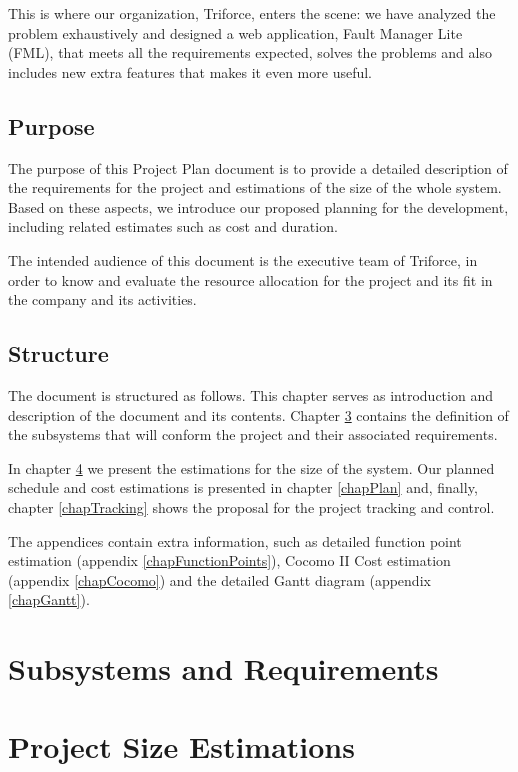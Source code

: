 \documentclass[11pt]{report}
\begin{document}
This is where our organization, Triforce, enters the scene: we have analyzed the problem exhaustively and designed a web application, Fault Manager Lite (FML), that meets all the requirements expected, solves the problems and also includes new extra features that makes it even more useful.

\section{Purpose}

The purpose of this Project Plan document is to provide a detailed description of the requirements for the project and estimations of the size of the whole system. Based on these aspects, we introduce our proposed planning for the development, including related estimates such as cost and duration.

The intended audience of this document is the executive team of Triforce, in order to know and evaluate the resource allocation for the project and its fit in the company and its activities.

\section{Structure}

The document is structured as follows. This chapter serves as introduction and description of the document and its contents. Chapter \ref{chapSubsystems} contains the definition of the subsystems that will conform the project and their associated requirements.

In chapter \ref{chapProjectSizeEstimations} we present the estimations for the size of the system. Our planned schedule and cost estimations is presented in chapter \ref{chapPlan} and, finally, chapter \ref{chapTracking} shows the proposal for the project tracking and control.

The appendices contain extra information, such as detailed function point estimation (appendix \ref{chapFunctionPoints}), Cocomo II Cost estimation (appendix \ref{chapCocomo}) and the detailed Gantt diagram (appendix \ref{chapGantt}).

\chapter{Subsystems and Requirements}
\label{chapSubsystems}



\chapter{Project Size Estimations}
\label{chapProjectSizeEstimations}

\end{document}
